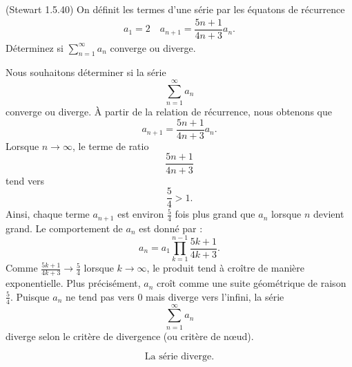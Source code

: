 \documentclass{report}
\begin{document}
    \begin{Exercice}{(Stewart 1.5.40)}{}
        On définit les termes d'une série par les équatons de récurrence  
        \begin{align*}
            a_1 = 2 \quad a_{n+1} = \dfrac{5n + 1}{4n + 3}a_n.
        \end{align*}
        Déterminez si $\sum_{n=1}^{\infty }a_n$ converge ou diverge.
    \end{Exercice}
    Nous souhaitons déterminer si la série 
    \[
    \sum_{n=1}^{\infty} a_n
    \] 
    converge ou diverge.
    À partir de la relation de récurrence, nous obtenons que
    \[
    a_{n+1} = \frac{5n + 1}{4n + 3} a_n.
    \]
    Lorsque $n \to \infty$, le terme de ratio 
    \[
    \frac{5n + 1}{4n + 3}
    \]
    tend vers 
    \[
    \frac{5}{4} > 1.
    \]
    Ainsi, chaque terme $a_{n+1}$ est environ $\frac{5}{4}$ fois plus grand que $a_n$ 
    lorsque $n$ devient grand.
    Le comportement de $a_n$ est donné par :
    \[
    a_n = a_1 \prod_{k=1}^{n-1} \frac{5k + 1}{4k + 3}.
    \]
    Comme $\frac{5k + 1}{4k + 3} \to \frac{5}{4}$ lorsque $k \to \infty$, le produit 
    tend à croître de manière exponentielle. Plus précisément, $a_n$ croît comme une 
    suite géométrique de raison $\frac{5}{4}$.
    Puisque $a_n$ ne tend pas vers 0 mais diverge vers l'infini, la série 
    \[
    \sum_{n=1}^{\infty} a_n
    \]
    diverge selon le critère de divergence (ou critère de nœud).

    \[
    \boxed{\text{La série diverge.}}
\]
    


        
\end{document}
